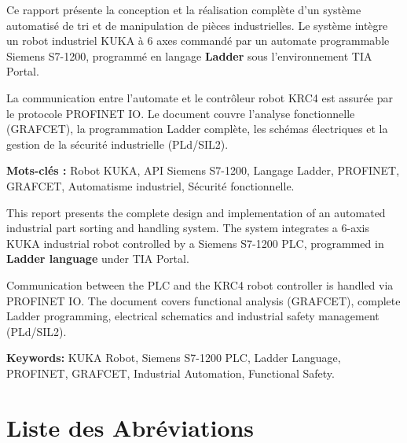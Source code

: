 \documentclass[12pt, a4paper]{report}
\newcommand{\api}{API}
\newcommand{\kuka}{KUKA}
\newcommand{\profinet}{PROFINET}
\newcommand{\tia}{TIA Portal}
\newcommand{\siemens}{Siemens S7-1200}
\begin{document}
\begin{infobox}
Ce rapport pr\'esente la conception et la r\'ealisation compl\`ete d'un syst\`eme automatis\'e de
tri et de manipulation de pi\`eces industrielles. Le syst\`eme int\`egre un robot industriel
\kuka{} \`a 6 axes command\'e par un automate programmable \siemens{}, programm\'e
en langage \textbf{Ladder} sous l'environnement \tia{}.

La communication entre l'automate et le contr\^oleur robot KRC4 est assur\'ee par le
protocole \profinet{} IO. Le document couvre l'analyse fonctionnelle (GRAFCET),
la programmation Ladder compl\`ete, les sch\'emas \'electriques et la gestion de la
s\'ecurit\'e industrielle (PLd/SIL2).

\textbf{Mots-cl\'es :} Robot \kuka{}, \api{} \siemens{}, Langage Ladder,
\profinet{}, GRAFCET, Automatisme industriel, S\'ecurit\'e fonctionnelle.
\end{infobox}

\vspace{1cm}

\begin{infobox}
This report presents the complete design and implementation of an automated industrial
part sorting and handling system. The system integrates a 6-axis \kuka{} industrial
robot controlled by a Siemens S7-1200 PLC, programmed in \textbf{Ladder language}
under TIA Portal.

Communication between the PLC and the KRC4 robot controller is handled via
\profinet{} IO. The document covers functional analysis (GRAFCET), complete Ladder
programming, electrical schematics and industrial safety management (PLd/SIL2).

\textbf{Keywords:} \kuka{} Robot, Siemens S7-1200 PLC, Ladder Language,
\profinet{}, GRAFCET, Industrial Automation, Functional Safety.
\end{infobox}

\cleardoublepage

\tableofcontents
\cleardoublepage
\listoffigures
{}
\cleardoublepage
\listoftables
{}
\cleardoublepage

\chapter*{Liste des Abr\'eviations}
\end{document}
